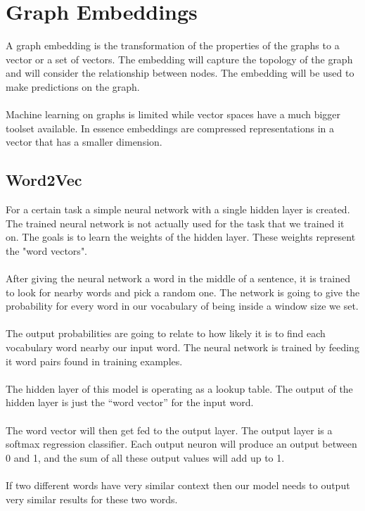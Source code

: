 \section{Graph Embeddings}
\label{sec:embeddings}

A graph embedding is the transformation of the properties of the graphs to a vector or a set of vectors. The embedding will capture the topology of the graph and will consider the relationship between nodes. The embedding will be used to make predictions on the graph.
\\
\\
\noindent Machine learning on graphs is limited while vector spaces have a much bigger toolset available. In essence embeddings are compressed representations in a vector that has a smaller dimension.

\subsection{Word2Vec}

For a certain task a simple neural network with a single hidden layer is created. The trained neural network is not actually used for the task that we trained it on. The goals is to learn the weights of the hidden layer. These weights represent the "word vectors".
\\
\\
After giving the neural network a word in the middle of a sentence, it is trained to look for nearby words and pick a random one. The network is going to give the probability for every word in our vocabulary of being inside a window size we set.
\\
\\
The output probabilities are going to relate to how likely it is to find each vocabulary word nearby our input word. The neural network is trained by feeding it word pairs found in training examples.
\\
\\
The hidden layer of this model is operating as a lookup table. The output of the hidden layer is just the “word vector” for the input word.
\\
\\
The word vector will then get fed to the output layer. The output layer is a softmax regression classifier. Each output neuron will produce an output between 0 and 1, and the sum of all these output values will add up to 1.
\\
\\
If two different words have very similar context then our model needs to output very similar results for these two words.


